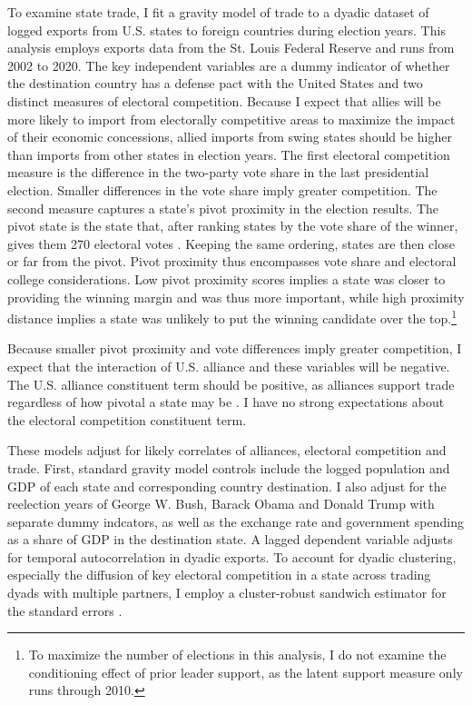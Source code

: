 \documentclass[12pt]{article}
\begin{document}
To examine state trade, I fit a gravity model of trade to a dyadic dataset of logged exports from U.S. states to foreign countries during election years.
This analysis employs exports data from the St. Louis Federal Reserve and runs from 2002 to 2020.
The key independent variables are a dummy indicator of whether the destination country has a defense pact with the United States and two distinct measures of electoral competition. 
Because I expect that allies will be more likely to import from electorally competitive areas to maximize the impact of their economic concessions, allied imports from swing states should be higher than imports from other states in election years. 
The first electoral competition measure is the difference in the two-party vote share in the last presidential election.
Smaller differences in the vote share imply greater competition.
The second measure captures a state's pivot proximity in the election results. 
The pivot state is the state that, after ranking states by the vote share of the winner, gives them 270 electoral votes \citep{Wright2009}.
Keeping the same ordering, states are then close or far from the pivot. 
Pivot proximity thus encompasses vote share and electoral college considerations. 
Low pivot proximity scores implies a state was closer to providing the winning margin and was thus more important, while high proximity distance implies a state was unlikely to put the winning candidate over the top.\footnote{To maximize the number of elections in this analysis, I do not examine the conditioning effect of prior leader support, as the latent support measure only runs through 2010.} 


Because smaller pivot proximity and vote differences imply greater competition, I expect that the interaction of U.S. alliance and these variables will be negative. 
The U.S. alliance constituent term should be positive, as alliances support trade regardless of how pivotal a state may be \citep{GowaMansfield2004, Fordham2010}. 
I have no strong expectations about the electoral competition constituent term.


These models adjust for likely correlates of alliances, electoral competition and trade.
First, standard gravity model controls include the logged population and GDP of each state and corresponding country destination. 
I also adjust for the reelection years of George W. Bush, Barack Obama and Donald Trump with separate dummy indcators, as well as the exchange rate and government spending as a share of GDP in the destination state. 
A lagged dependent variable adjusts for temporal autocorrelation in dyadic exports.
To account for dyadic clustering, especially the diffusion of key electoral competition in a state across trading dyads with multiple partners, I employ a cluster-robust sandwich estimator for the standard errors \citep{Aronowetal2015}.
\end{document}
